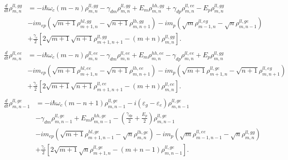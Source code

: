 \documentclass[aps,prb,
superscriptaddress,
,floatfix,footinbib,longbibliography,
preprint
]{revtex4-2}
\begin{document}
%
%
\begin{equation}
\begin{split}
\frac{d}{dt}\rho_{m,n}^{ll,gg}&=-i\hbar\omega_{c}(m-n)\rho_{m,n}^{ll,gg}-\gamma_{dm}\rho_{m,n}^{ll,gg}
+E_{m}\rho_{m,n}^{hh,gg}+\gamma_{dp}\rho_{m,n}^{ll,ee}-E_{p}\rho_{m,n}^{ll,gg}\\
&-im_{ep}(\sqrt{m+1}\rho_{m+1,n}^{hl,gg}-\sqrt{n+1}\rho_{m,n+1}^{lh,gg})
-im_{p}(\sqrt{m}\rho_{m-1,n}^{ll,eg}-\sqrt{n}\rho_{m,n-1}^{ll,ge})\\
&+\frac{\gamma_{c}}{2}[2\sqrt{m+1}\sqrt{n+1}\rho_{m+1,n+1}^{ll,gg}-(m+n)\rho_{m,n}^{ll,gg}].\\
\end{split}
\label{ll,gg}
\end{equation}
%
\begin{equation}
\begin{split}
\frac{d}{dt}\rho_{m,n}^{ll,ee}&=-i\hbar\omega_{c}(m-n)\rho_{m,n}^{ll,ee}-\gamma_{dm}\rho_{m,n}^{ll,ee}
+E_{m}\rho_{m,n}^{hh,ee}-\gamma_{dp}\rho_{m,n}^{ll,ee}+E_{p}\rho_{m,n}^{ll,gg}\\
&-im_{ep}(\sqrt{m+1}\rho_{m+1,n}^{hl,ee}-\sqrt{n+1}\rho_{m,n+1}^{lh,ee})
-im_{p}(\sqrt{m+1}\rho_{m+1,n}^{ll,ge}-\sqrt{n+1}\rho_{m,n+1}^{ll,eg})\\
&+\frac{\gamma_{c}}{2}[2\sqrt{m+1}\sqrt{n+1}\rho_{m+1,n+1}^{ll,ee}-(m+n)\rho_{m,n}^{ll,ee}].\\
\end{split}
\label{ll,ee}
\end{equation}
%
\begin{equation}
\begin{split}
\frac{d}{dt}\rho_{m,n-1}^{ll,ge}&=-i\hbar\omega_{c}(m-n+1)\rho_{m,n-1}^{ll,ge}
-i(\varepsilon_{g}-\varepsilon_{e})\rho_{m,n-1}^{ll,ge}\\
&-\gamma_{dm}\rho_{m,n-1}^{ll,ge}+E_{m}\rho_{m,n-1}^{hh,ge}
-(\frac{\gamma_{dp}}{2}+\frac{{E_{p}}}{2})\rho_{m,n-1}^{ll,ge}\\
&-im_{ep}(\sqrt{m+1}\rho_{m+1,n-1}^{hl,ge}-\sqrt{n}\rho_{m,n}^{lh,ge})
-im_{p}(\sqrt{m}\rho_{m-1,n-1}^{ll,ee}-\sqrt{n}\rho_{m,n}^{ll,gg})\\
&+\frac{\gamma_{c}}{2}[2\sqrt{m+1}\sqrt{n}\rho_{m+1,n}^{ll,ge}-(m+n-1)\rho_{m,n-1}^{ll,ge}].\\
\end{split}
\label{ll,ge}
\end{equation}
\end{document}
